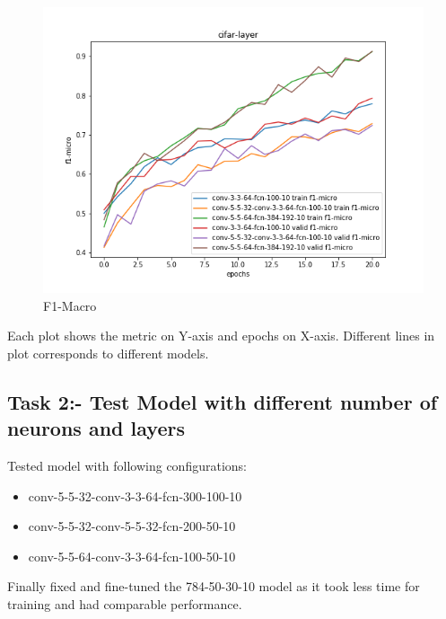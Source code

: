 \documentclass{article}
\begin{document}
\begin{figure}[!htb]
	\includegraphics[width=\linewidth]{../output_plots/CIFAR/task-1/cifar-layer-F1-micro-score-f1-micro.png}
	\caption{F1-Macro}\label{fig:part_2_task_1_f1-macro}
	\endminipage
\end{figure}

Each plot shows the metric on Y-axis and epochs on X-axis. Different lines in plot corresponds to different models.

\subsection{Task 2:- Test Model with different number of neurons and layers}

Tested model with following configurations:
\begin{itemize}
	\item conv-5-5-32-conv-3-3-64-fcn-300-100-10
	\item conv-5-5-32-conv-5-5-32-fcn-200-50-10
	\item conv-5-5-64-conv-3-3-64-fcn-100-50-10
\end{itemize}

Finally fixed and fine-tuned the 784-50-30-10 model as it took less time for training and had comparable performance.
\end{document}
